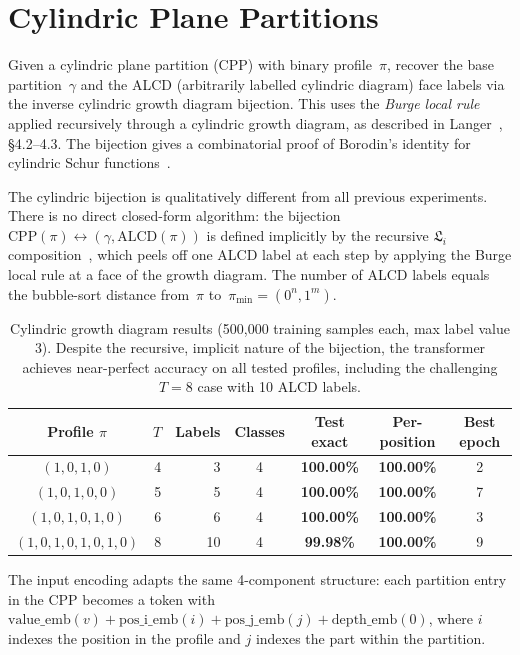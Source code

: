 \documentclass[11pt,a4paper]{article}
\begin{document}
\section{Cylindric Plane Partitions}

Given a cylindric plane partition (CPP) with binary profile~$\pi$, recover the base partition~$\gamma$ and the ALCD (arbitrarily labelled cylindric diagram) face labels via the inverse cylindric growth diagram bijection. This uses the \emph{Burge local rule} applied recursively through a cylindric growth diagram, as described in Langer~\cite{langer2013}, \S4.2--4.3. The bijection gives a combinatorial proof of Borodin's identity for cylindric Schur functions~\cite{langer2012}.

The cylindric bijection is qualitatively different from all previous experiments. There is no direct closed-form algorithm: the bijection $\mathrm{CPP}(\pi) \leftrightarrow (\gamma, \mathrm{ALCD}(\pi))$ is defined implicitly by the recursive $\mathfrak{L}_i$ composition~\cite{langer2013}, which peels off one ALCD label at each step by applying the Burge local rule at a face of the growth diagram. The number of ALCD labels equals the bubble-sort distance from~$\pi$ to~$\pi_{\min} = (0^n, 1^m)$.

\begin{table}[h]
\centering
\begin{tabular}{crrcccc}
\toprule
Profile $\pi$ & $T$ & Labels & Classes & Test exact & Per-position & Best epoch \\
\midrule
$(1,0,1,0)$ & 4 & 3 & 4 & \textbf{100.00\%} & \textbf{100.00\%} & 2 \\
$(1,0,1,0,0)$ & 5 & 5 & 4 & \textbf{100.00\%} & \textbf{100.00\%} & 7 \\
$(1,0,1,0,1,0)$ & 6 & 6 & 4 & \textbf{100.00\%} & \textbf{100.00\%} & 3 \\
$(1,0,1,0,1,0,1,0)$ & 8 & 10 & 4 & \textbf{99.98\%} & \textbf{100.00\%} & 9 \\
\bottomrule
\end{tabular}
\caption{Cylindric growth diagram results (500{,}000 training samples each, max label value 3). Despite the recursive, implicit nature of the bijection, the transformer achieves near-perfect accuracy on all tested profiles, including the challenging $T{=}8$ case with 10 ALCD labels.}
\end{table}

The input encoding adapts the same 4-component structure: each partition entry in the CPP becomes a token with $\mathrm{value\_emb}(v) + \mathrm{pos\_i\_emb}(i) + \mathrm{pos\_j\_emb}(j) + \mathrm{depth\_emb}(0)$, where $i$ indexes the position in the profile and $j$ indexes the part within the partition.
\end{document}
